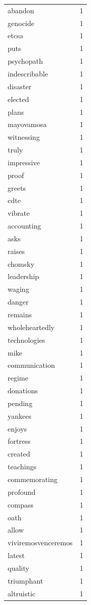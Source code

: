\begin{tabular}{lr}
abandon & 1 \\
genocide & 1 \\
etcsa & 1 \\
puts & 1 \\
psychopath & 1 \\
indescribable & 1 \\
disaster & 1 \\
elected & 1 \\
plans & 1 \\
mayovamosa & 1 \\
witnessing & 1 \\
truly & 1 \\
impressive & 1 \\
proof & 1 \\
greets & 1 \\
cdte & 1 \\
vibrate & 1 \\
accounting & 1 \\
asks & 1 \\
raises & 1 \\
chomsky & 1 \\
leadership & 1 \\
waging & 1 \\
danger & 1 \\
remains & 1 \\
wholeheartedly & 1 \\
technologies & 1 \\
mike & 1 \\
communication & 1 \\
regime & 1 \\
donations & 1 \\
pending & 1 \\
yankees & 1 \\
enjoys & 1 \\
fortress & 1 \\
created & 1 \\
teachings & 1 \\
commemorating & 1 \\
profound & 1 \\
compass & 1 \\
oath & 1 \\
allow & 1 \\
viviremosvenceremos & 1 \\
latest & 1 \\
quality & 1 \\
triumphant & 1 \\
altruistic & 1 \\

\end{tabular}
